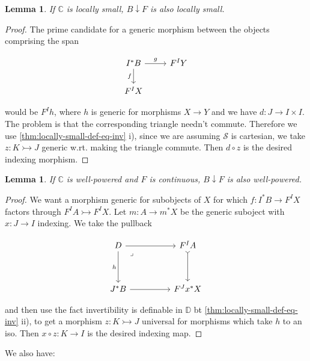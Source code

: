 \documentclass[10pt, oneside]{article}
\newtheorem{lemma}[theorem]{Lemma}
\begin{document}
\begin{lemma}
    If $\mathbb{C}$ is locally small, $B \downarrow F$ is also locally small.
\end{lemma}
\begin{proof}
    The prime candidate for a generic morphism between the objects comprising the span

    \[\begin{tikzcd}[ampersand replacement=\&]
	{I^\ast B} \& {F^I Y} \\
	{F^I X}
	\arrow["f"', from=1-1, to=2-1]
	\arrow["g", from=1-1, to=1-2]
\end{tikzcd}\]

    \noindent would be $F^I h$, where $h$ is generic for morphisms $X \to Y$ and we have $d: J \to I \times I$. The problem is that the corresponding triangle needn't commute. Therefore we use \ref{thm:locally-small-def-eq-inv} i), since we are assuming $\mathcal{S}$ is cartesian, we take $z: K \rightarrowtail J$ generic w.rt. making the triangle commute. Then $d \circ z$ is the desired indexing morphism.
\end{proof}

\begin{lemma}
    If $\mathbb{C}$ is well-powered and $F$ is continuous, $B \downarrow F$ is also well-powered.
\end{lemma}
\begin{proof}
    We want a morphism generic for subobjects of $X$ for which $f: I^\ast B \to F^I X$ factors through $F^I A \rightarrowtail F^I X$. Let $m: A \to m^\ast X$ be the generic suboject with $x: J \to I$ indexing. We take the pullback

    \[\begin{tikzcd}[ampersand replacement=\&]
	D \&\& {F^I A} \\
	\\
	{J^\ast B} \&\& {F^J x^\ast X}
	\arrow[from=3-1, to=3-3]
	\arrow[tail, from=1-3, to=3-3]
	\arrow["h"', from=1-1, to=3-1]
	\arrow[from=1-1, to=1-3]
	\arrow["\lrcorner"{anchor=center, pos=0.125}, draw=none, from=1-1, to=3-3]
\end{tikzcd}\]
    
    \noindent and then use the fact invertibility is definable in $\mathbb{D}$ bt \ref{thm:locally-small-def-eq-inv} ii), to get a morphism $z: K \rightarrowtail J$ universal for morphisms which take $h$ to an iso. Then  $x \circ z:K \to I$ is the desired indexing map.
\end{proof}


We also have:
\end{document}
